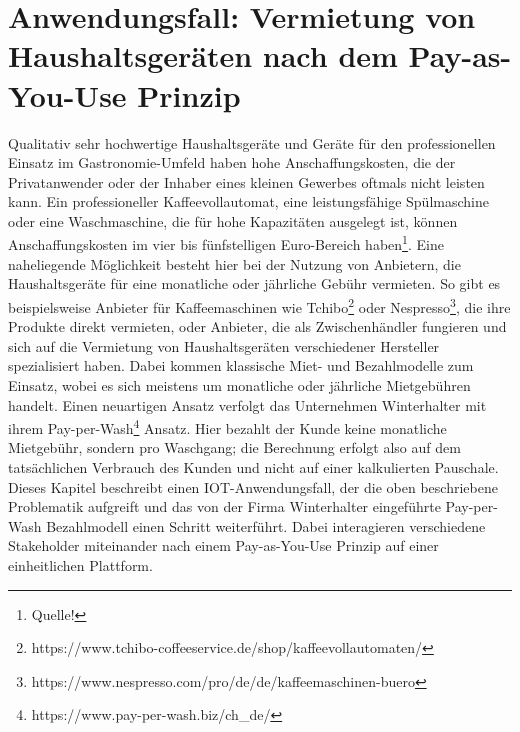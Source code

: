 \chapter{Anwendungsfall: Vermietung von Haushaltsgeräten nach dem Pay-as-You-Use Prinzip}
\label{ch:iot_usecase}
Qualitativ sehr hochwertige Haushaltsgeräte und Geräte für den professionellen Einsatz im Gastronomie-Umfeld haben hohe Anschaffungskosten, die der Privatanwender oder der Inhaber eines kleinen Gewerbes oftmals nicht leisten kann. Ein professioneller Kaffeevollautomat, eine leistungsfähige Spülmaschine oder eine Waschmaschine, die für hohe Kapazitäten ausgelegt ist, können Anschaffungskosten im vier bis fünfstelligen Euro-Bereich haben\footnote{Quelle!}. Eine naheliegende Möglichkeit besteht hier bei der Nutzung von Anbietern, die Haushaltsgeräte für eine monatliche oder jährliche Gebühr vermieten. So gibt es beispielsweise Anbieter für Kaffeemaschinen wie Tchibo\footnote{https://www.tchibo-coffeeservice.de/shop/kaffeevollautomaten/} oder Nespresso\footnote{https://www.nespresso.com/pro/de/de/kaffeemaschinen-buero}, die ihre Produkte direkt vermieten, oder Anbieter, die als Zwischenhändler fungieren und sich auf die Vermietung von Haushaltsgeräten verschiedener Hersteller spezialisiert haben. Dabei kommen klassische Miet- und Bezahlmodelle zum Einsatz, wobei es sich meistens um monatliche oder jährliche Mietgebühren handelt. Einen neuartigen Ansatz verfolgt das Unternehmen Winterhalter mit ihrem Pay-per-Wash\footnote{https://www.pay-per-wash.biz/ch\_de/} Ansatz. Hier bezahlt der Kunde keine monatliche Mietgebühr, sondern pro Waschgang; die Berechnung erfolgt also auf dem tatsächlichen Verbrauch des Kunden und nicht auf einer kalkulierten Pauschale.\\
Dieses Kapitel beschreibt einen IOT-Anwendungsfall, der die oben beschriebene Problematik aufgreift und das von der Firma Winterhalter eingeführte Pay-per-Wash Bezahlmodell einen Schritt weiterführt. Dabei interagieren verschiedene Stakeholder miteinander nach einem Pay-as-You-Use Prinzip auf einer einheitlichen Plattform.
%
%
